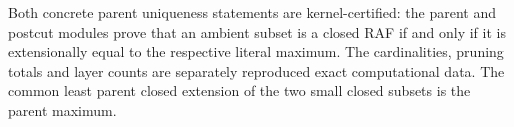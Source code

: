 Both concrete parent uniqueness statements are kernel-certified: the parent and postcut modules prove that an ambient subset is a closed RAF if and only if it is extensionally equal to the respective literal maximum. The cardinalities, pruning totals and layer counts are separately reproduced exact computational data. The common least parent closed extension of the two small closed subsets is the parent maximum.
